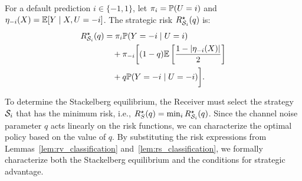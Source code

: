 \begin{lemma} \label{lem:rs_classification}
For a default prediction $i \in \{-1, 1\}$, let $\pi_i = \mathbb{P}(U=i)$ and $\eta_{-i}(X) = \mathbb{E}[Y \mid X, U=-i]$. The strategic risk $R_{\mathcal{S}_i}^\star(q)$ is:
\begin{align}
R_{\mathcal{S}_i}^\star(q) &= \pi_i \mathbb{P}(Y = -i \mid U=i) \nonumber \\
&\quad + \pi_{-i} \biggl[ (1-q) \mathbb{E} \left[ \frac{1-|\eta_{-i}(X)|}{2} \right] \nonumber \\
&\quad + q \mathbb{P}(Y = -i \mid U = -i) \biggr]. \label{eq:rs_classification}
\end{align}
\end{lemma}

To determine the Stackelberg equilibrium, the Receiver must select the strategy $\mathcal{S}_i$ that has the minimum risk, i.e., $R_S^\star(q) = \min_i R_{\mathcal{S}_i}^\star(q)$. Since the channel noise parameter $q$ acts linearly on the risk functions, we can characterize the optimal policy based on the value of $q$. By substituting the risk expressions from Lemmas~\ref{lem:rv_classification} and~\ref{lem:rs_classification}, we formally characterize both the Stackelberg equilibrium and the conditions for strategic advantage.

